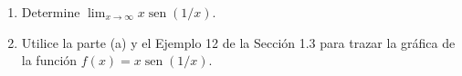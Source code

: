 \item 
\begin{enumerate}
        \item[(a)] Determine $\displaystyle \lim_{x \to \infty} x \operatorname{sen}(1/x)$.
        \item[(b)] Utilice la parte (a) y el Ejemplo 12 de la Sección 1.3 para trazar la gráfica de la función $f(x) = x \operatorname{sen}(1/x)$.
    \end{enumerate}

